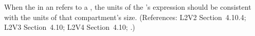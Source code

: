 When the  in an \InitialAssignment refers to a
\Compartment, the units of the \InitialAssignment's  expression
should be consistent with the units of that compartment's size.  (References:
L2V2 Section~4.10.4; L2V3 Section~4.10; L2V4 Section~4.10; .)
